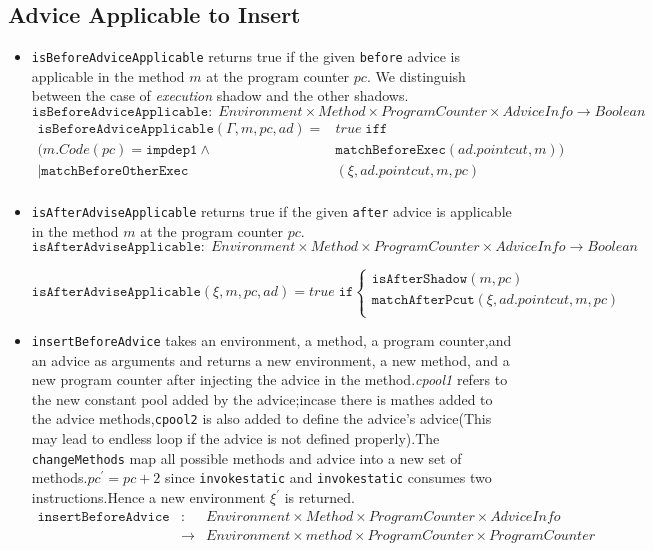 \subsection{Advice Applicable to Insert}
\begin{itemize}
\item
  \texttt{isBeforeAdviceApplicable} returns true if the given \texttt{before} advice is applicable in the method $m$ at the program counter $pc$. We distinguish between the case of \textsl{execution} shadow and the other shadows.
$$\texttt{isBeforeAdviceApplicable}:\;Environment\times Method\times ProgramCounter\times AdviceInfo\rightarrow Boolean$$
\begin{align*}
\texttt{isBeforeAdviceApplicable}(\Gamma,m,pc,ad)=&true\;\texttt{iff}\\
(m.Code(pc)=\texttt{impdep1}\wedge & \texttt{matchBeforeExec}(ad.pointcut,m))\\
|\texttt{matchBeforeOtherExec}&(\xi,ad.pointcut,m,pc)\\
\end{align*}

\item
\texttt{isAfterAdviseApplicable} returns true if the given \texttt{after} advice is applicable in the method $m$ at the program counter $pc$.
$$\texttt{isAfterAdviseApplicable}:\; Environment\times Method\times ProgramCounter\times AdviceInfo\rightarrow Boolean$$

$\texttt{isAfterAdviseApplicable}(\xi,m,pc,ad)=true\;\texttt{if}\left\{
\begin{array}{l}
  \texttt{isAfterShadow}(m,pc)\\
  \texttt{matchAfterPcut}(\xi,ad.pointcut,m,pc)\\
\end{array}\right.$

\item
\texttt{insertBeforeAdvice} takes an environment, a method, a program counter,and an advice as arguments and returns a new environment, a new method, and a new program counter after injecting the advice in the method.\textsl{cpool1} refers to the new constant pool added by the advice;incase there is mathes added to the advice methods,\texttt{cpool2} is also added to define the advice's advice(This may lead to endless loop if the advice is not defined properly).The \texttt{changeMethods} map all possible methods and advice into a new set of methods.$pc^\prime=pc+2$ since \texttt{invokestatic} and \texttt{invokestatic} consumes two instructions.Hence a new environment $\xi^\prime$ is returned. 
\begin{eqnarray*}
\texttt{insertBeforeAdvice}& :\;\;& Environment\times Method\times ProgramCounter\times AdviceInfo\\
 &\rightarrow&Environment\times method\times ProgramCounter\times ProgramCounter\\
\end{eqnarray*}


\end{itemize}
